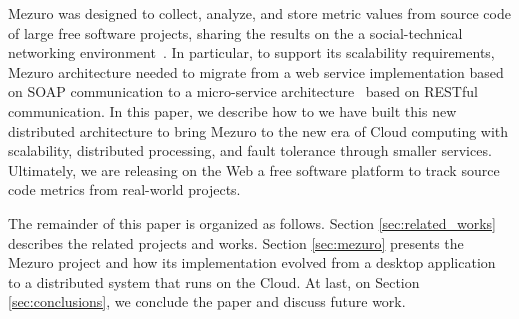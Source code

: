 Mezuro was designed to collect, analyze, and store metric values from source
code of large free software projects, sharing the results on the a
social-technical networking environment~\cite{mezuro2012}. In particular, to
support its scalability requirements, Mezuro architecture needed to migrate
from a web service implementation based on SOAP communication to a
micro-service architecture~\cite{namiot2014micro} based on RESTful
communication. In this paper, we describe how to we have built this new
distributed architecture to bring Mezuro to the new era of Cloud computing with
scalability, distributed processing, and fault tolerance through smaller
services. Ultimately, we are releasing on the Web a free software platform to
track source code metrics from real-world projects.

The remainder of this paper is organized as follows. Section
\ref{sec:related_works} describes the related projects and works. Section
\ref{sec:mezuro} presents the Mezuro project and how its implementation evolved
from a desktop application to a distributed system that runs on the Cloud. At
last, on Section \ref{sec:conclusions}, we conclude the paper and discuss
future work.
